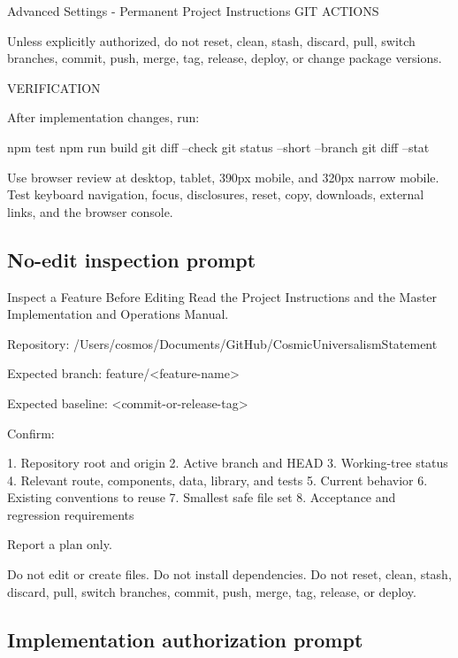\documentclass[11pt,letterpaper]{article}
\begin{document}
\begin{promptbox}{Advanced Settings - Permanent Project Instructions}
GIT ACTIONS

Unless explicitly authorized, do not reset, clean, stash, discard,
pull, switch branches, commit, push, merge, tag, release, deploy, or
change package versions.

VERIFICATION

After implementation changes, run:

npm test
npm run build
git diff --check
git status --short --branch
git diff --stat

Use browser review at desktop, tablet, 390px mobile, and 320px narrow
mobile. Test keyboard navigation, focus, disclosures, reset, copy,
downloads, external links, and the browser console.
\end{promptbox}

\subsection{No-edit inspection prompt}

\begin{promptbox}{Inspect a Feature Before Editing}
Read the Project Instructions and the Master Implementation and
Operations Manual.

Repository:
/Users/cosmos/Documents/GitHub/CosmicUniversalismStatement

Expected branch:
feature/<feature-name>

Expected baseline:
<commit-or-release-tag>

Confirm:

1. Repository root and origin
2. Active branch and HEAD
3. Working-tree status
4. Relevant route, components, data, library, and tests
5. Current behavior
6. Existing conventions to reuse
7. Smallest safe file set
8. Acceptance and regression requirements

Report a plan only.

Do not edit or create files.
Do not install dependencies.
Do not reset, clean, stash, discard, pull, switch branches, commit,
push, merge, tag, release, or deploy.
\end{promptbox}

\subsection{Implementation authorization prompt}
\end{document}
